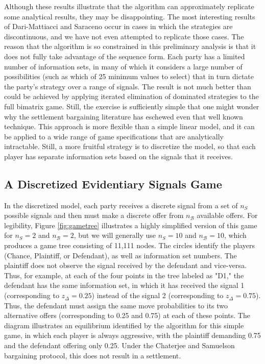 \documentclass{article}
\begin{document}
Although these results illustrate that the algorithm can approximately replicate some analytical results, they may be disappointing. The most interesting results of Dari-Mattiacci and Saraceno occur in cases in which the strategies are discontinuous, and we have not even attempted to replicate those cases. The reason that the algorithm is so constrained in this preliminary analysis is that it does not fully take advantage of the sequence form. Each party has a limited number of information sets, in many of which it considers a large number of possibilities (such as which of 25 minimum values to select) that in turn dictate the party's strategy over a range of signals. The result is not much better than could be achieved by applying iterated elimination of dominated strategies to the full bimatrix game. Still, the exercise is sufficiently simple that one might wonder why the settlement bargaining literature has eschewed even that well known technique. This approach is more flexible than a simple linear model, and it can be applied to a wide range of game specifications that are analytically intractable. Still, a more fruitful strategy is to discretize the model, so that each player has separate information sets based on the signals that it receives.

\subsection{A Discretized Evidentiary Signals Game} 

In the discretized model, each party receives a discrete signal from a set of $n_S$ possible signals and then must make a discrete offer from $n_{\mathcal{B}}$ available offers. For legibility, Figure \ref{fig:gametree} illustrates a highly simplified version of this game for  $n_S=2$ and $n_{\mathcal{B}}=2$, but we will generally use  $n_S=10$ and $n_{\mathcal{B}}=10$, which produces a game tree consisting of 11,111 nodes. The circles identify the players (Chance, Plaintiff, or Defendant), as well as information set numbers. The plaintiff does not observe the signal received by the defendant and vice-versa. Thus, for example, at each of the four points in the tree labeled as "D1," the defendant has the same information set, in which it has received the signal 1 (corresponding to $z_\Delta = 0.25$) instead of the signal 2 (corresponding to $z_\Delta = 0.75$). Thus, the defendant must assign the same move probabilities to its two alternative offers (corresponding to 0.25 and 0.75) at each of these points. The diagram illustrates an equilibrium identified by the algorithm for this simple game, in which each player is always aggressive, with the plaintiff demanding 0.75 and the defendant offering only 0.25. Under the Chaterjee and Samuelson bargaining protocol, this does not result in a settlement.
\end{document}
